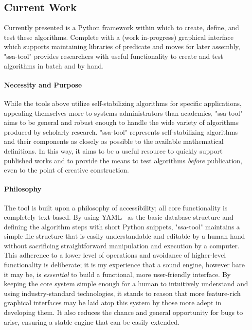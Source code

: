 \subsection{Current Work}
\label{sec:introduction:current-work}
Currently presented is a Python framework within which to
  create, define, and test these algorithms.
Complete with a (work in-progress) graphical interface which supports
  maintaining libraries of predicate and moves for later assembly,
  "ssa-tool" provides researchers with useful functionality
  to create and test algorithms in batch and by hand.

\paragraph{Necessity and Purpose}
While the tools above utilize self-stabilizing algorithms for specific applications,
  appealing themselves more to systems administrators than academics,
  "ssa-tool" aims to be general and robust enough to handle
  the wide variety of algorithms produced by scholarly research.
"ssa-tool" represents self-stabilizing algorithms and their components
  as closely as possible to the available mathematical definitions.
In this way, it aims to be a useful resource to quickly support published works
  and to provide the means to test algorithms \emph{before} publication,
  even to the point of creative construction.

\paragraph{Philosophy}
The tool is built upon a philosophy of accessibility;
  all core functionality is completely text-based.
By using YAML~\autocite{yaml:ref} as the basic database structure
  and defining the algorithm steps with short Python snippets,
  "ssa-tool" maintains a simple file structure that is easily
  understandable and editable by a human hand
  without sacrificing straightforward
  manipulation and execution by a computer.
This adherence to a lower level of operations and
  avoidance of higher-level functionality is deliberate;
  it is my experience that a sound engine, however bare it may be,
  is \emph{essential} to build a functional, more user-friendly interface.
By keeping the core system simple enough
  for a human to intuitively understand
  and using industry-standard technologies,
  it stands to reason that more feature-rich graphical interfaces
  may be laid atop this system
  by those more adept in developing them.
It also reduces the chance and general opportunity for bugs to arise,
  ensuring a stable engine that can be easily extended.


